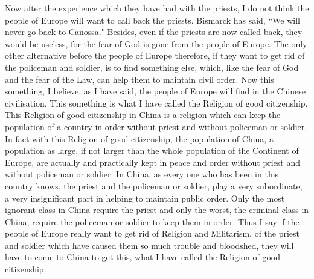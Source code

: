 Now after the experience which they have had with the priests, I do not think the people of Europe will want to call back the priests.
Bismarck  has said, ``We will never go back to Canossa."
Besides, even if the priests are now called back, they would be useless, for the fear of God is gone from the people of Europe.
The only other alternative before the people of Europe therefore, if they want to get rid of the policeman and soldier, is to find something else, which, like the fear of God and the fear of the Law, can help them to maintain civil order.
Now this something, I believe, as I have said, the people of Europe will find in the Chinese civilisation.
This something is what I have called the Religion of good citizenship.
This Religion of good citizenship in China is a religion which can keep the population of a country in order without priest and without policeman or soldier.
In fact with this Religion of good citizenship, the population of China, a population as large, if not larger than the whole population of the Continent of Europe, are actually and practically kept in peace and order without priest and without policeman or soldier.
In China, as every one who has been in this country knows, the priest and the policeman or soldier, play a very subordinate, a very insignificant part in helping to maintain public order.
Only the most ignorant class in China require the priest and only the worst, the criminal class in China, require the policeman or soldier to keep them in order.
Thus I say if the people of Europe really want to get rid of Religion and Militarism, of the priest and soldier which have caused them so much trouble and bloodshed, they will have to come to China to get this, what I have called the Religion of good citizenship.


